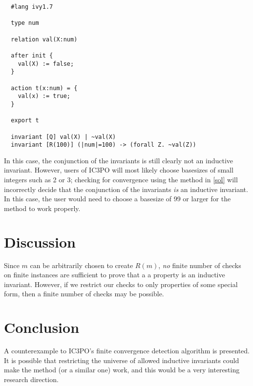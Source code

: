 \documentclass[12pt]{article}
\begin{document}
\begin{verbatim}
  #lang ivy1.7

  type num

  relation val(X:num)

  after init {
    val(X) := false;
  }

  action t(x:num) = {
    val(x) := true;
  }

  export t

  invariant [Q] val(X) | ~val(X)
  invariant [R(100)] (|num|=100) -> (forall Z. ~val(Z))
\end{verbatim}

In this case, the conjunction of the invariants is still clearly not an inductive invariant.  However, users of IC3PO will most likely choose basesizes of small integers such as 2 or 3; checking for convergence using the method in \ref{sol} will incorrectly decide that the conjunction of the invariants \textit{is} an inductive invariant.  In this case, the user would need to choose a basesize of 99 or larger for the method to work properly.

\section{Discussion}
Since $m$ can be arbitrarily chosen to create $R(m)$, \textit{no} finite number of checks on finite instances are sufficient to prove that a a property is an inductive invariant.  However, if we restrict our checks to only properties of some special form, then a finite number of checks may be possible.

\section{Conclusion}
A counterexample to IC3PO's finite convergence detection algorithm is presented.  It is possible that restricting the universe of allowed inductive invariants could make the method (or a similar one) work, and this would be a very interesting research direction.




\end{document}
